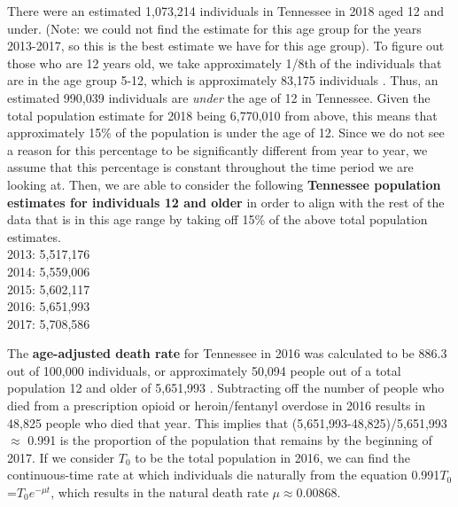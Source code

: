 \documentclass[12pt]{article}
\begin{document}
There were an estimated 1,073,214 individuals in Tennessee in 2018 aged 12 and under. (Note: we could not find the estimate for this age group for the years 2013-2017, so this is the best estimate we have for this age group). To figure out those who are 12 years old, we take approximately 1/8th of the individuals that are in the age group 5-12, which is approximately 83,175 individuals \cite{DOHHS}. Thus, an estimated 990,039 individuals are \emph{under} the age of 12 in Tennessee. Given the total population estimate for 2018 being 6,770,010 from above, this means that approximately 15\% of the population is under the age of 12. Since we do not see a reason for this percentage to be significantly different from year to year, we assume that this percentage is constant throughout the time period we are looking at. Then, we are able to consider the following \textbf{Tennessee population estimates for individuals 12 and older} in order to align with the rest of the data that is in this age range by taking off 15\% of the above total population estimates.  \\
2013: 5,517,176 \\
2014: 5,559,006 \\
2015: 5,602,117 \\
2016: 5,651,993 \\
2017: 5,708,586 

The \textbf{age-adjusted death rate} for Tennessee in 2016 was calculated to be 886.3 out of 100,000 individuals, or approximately 50,094 people out of a total population 12 and older of 5,651,993 \cite{Kaiser}. Subtracting off the number of people who died from a prescription opioid or heroin/fentanyl overdose in 2016 results in 48,825 people who died that year. This implies that (5,651,993-48,825)/5,651,993 $\approx$ 0.991 is the proportion of the population that remains by the beginning of 2017. If we consider $T_0$ to be the total population in 2016, we can find the continuous-time rate at which individuals die naturally from the equation 0.991$T_0$=$T_0e^{-\mu t}$, which results in the natural death rate $\mu \approx 0.00868$.
\end{document}
